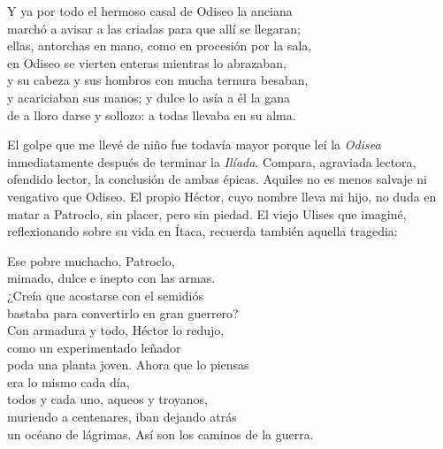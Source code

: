 \begin{versocita}
Y ya por todo el hermoso casal de Odiseo la anciana\\
marchó a avisar a las criadas para que allí se llegaran;\\
ellas, antorchas en mano, como en procesión por la sala,\\
en Odiseo se vierten enteras mientras lo abrazaban,\\
y su cabeza y sus hombros con mucha ternura besaban,\\
y acariciaban sus manos; y dulce lo asía a él la gana\\
de a lloro darse y sollozo: a todas llevaba en su alma.
\end{versocita}

El golpe que me llevé de niño fue todavía mayor porque leí la \emph{Odisea} inmediatamente después de terminar la \emph{Ilíada}. Compara, agraviada lectora, ofendido lector, la conclusión de ambas épicas. Aquiles no es menos salvaje ni vengativo que Odiseo. El propio Héctor, cuyo nombre lleva mi hijo, no duda en matar a Patroclo, sin placer, pero sin piedad. El viejo Ulises que imaginé, reflexionando sobre su vida en Ítaca, recuerda también aquella tragedia:

\begin{versopropio}
Ese pobre muchacho, Patroclo,\\
mimado, dulce e inepto con las armas.\\
¿Creía que acostarse con el semidiós\\
bastaba para convertirlo en gran guerrero?\\
Con armadura y todo, Héctor lo redujo,\\
como un experimentado leñador\\
poda una planta joven. Ahora que lo piensas\\
era lo mismo cada día,\\
todos y cada uno, aqueos y troyanos,\\
muriendo a centenares, iban dejando atrás\\
un océano de lágrimas. Así son los caminos de la guerra.
\end{versopropio}

%


